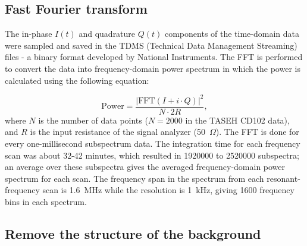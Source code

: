
\subsection{Fast Fourier transform}
\label{sec:FFT}
The in-phase $I(t)$ and quadrature $Q(t)$ components of the time-domain 
data were sampled and saved in the TDMS 
(Technical Data Management Streaming) files - a 
binary format developed by National Instruments.
The FFT is performed to convert the data into 
frequency-domain power spectrum in which the power is calculated 
using the following equation:

\begin{equation}
\label{eq:4.1}
    \text{Power} = \frac{|\text{FFT}(I+i \cdot Q)|^{2}}{N \cdot 2R},
\end{equation}
where $N$ is the number of data points ($N  = 2000$ in the TASEH 
CD102 data), and $R$ is the input resistance of the signal analyzer 
(50~$\Omega$).
The FFT is done for every one-millisecond subspectrum data. The integration 
time for each frequency scan was about 32-42 minutes, which resulted 
in 1920000 to 2520000 subspectra; an average over these subspectra gives 
the averaged frequency-domain power spectrum for each scan. 
The frequency span in the spectrum from each resonant-frequency scan is 
1.6~MHz while the 
resolution is 1~kHz, giving 1600 frequency bins in each spectrum. 

\subsection{Remove the structure of the background}

